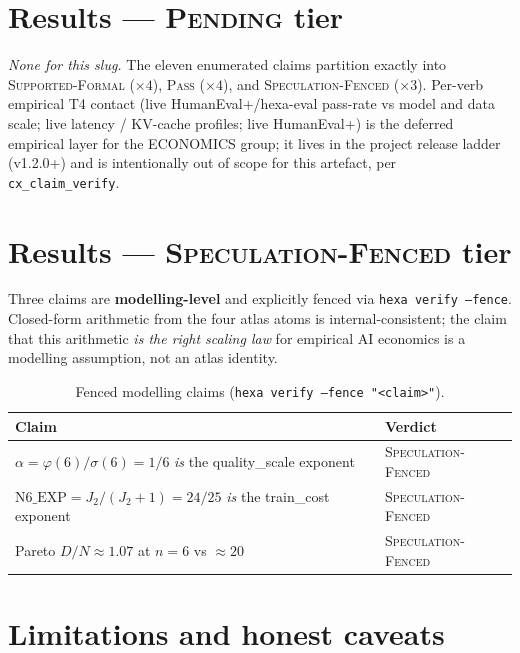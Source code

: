 \documentclass[11pt,a4paper]{article}
\begin{document}
\section{Results --- \textsc{Pending} tier}
\label{sec:pending}

\emph{None for this slug.} The eleven enumerated claims partition
exactly into \textsc{Supported-Formal} ($\times 4$), \textsc{Pass}
($\times 4$), and \textsc{Speculation-Fenced} ($\times 3$).
Per-verb empirical T4 contact (live HumanEval+/hexa-eval pass-rate vs
model and data scale; live latency / KV-cache profiles; live
HumanEval+) is the deferred empirical layer for the ECONOMICS group;
it lives in the project release ladder (v1.2.0+) and is intentionally
out of scope for this artefact, per \texttt{cx\_claim\_verify}.

\section{Results --- \textsc{Speculation-Fenced} tier}
\label{sec:fenced}

Three claims are \textbf{modelling-level} and explicitly fenced via
\texttt{hexa verify --fence}. Closed-form arithmetic from the four
atlas atoms is internal-consistent; the claim that this arithmetic
\emph{is the right scaling law} for empirical AI economics is a
modelling assumption, not an atlas identity.

\begin{table}[h]
\centering
\caption{Fenced modelling claims (\texttt{hexa verify --fence "<claim>"}).}
\label{tab:fenced}
\begin{tabular}{ll}
\toprule
\textbf{Claim} & \textbf{Verdict} \\
\midrule
$\alpha = \varphi(6)/\sigma(6) = 1/6$ \emph{is} the quality\_scale exponent       & \textsc{Speculation-Fenced} \\
$\mathrm{N6\_EXP} = J_2/(J_2{+}1) = 24/25$ \emph{is} the train\_cost exponent     & \textsc{Speculation-Fenced} \\
Pareto $D/N \approx 1.07$ at $n=6$ vs $\approx 20$~\cite{hoffmann2022chinchilla} & \textsc{Speculation-Fenced} \\
\bottomrule
\end{tabular}
\end{table}

\section{Limitations and honest caveats}
\label{sec:limits}
\end{document}
